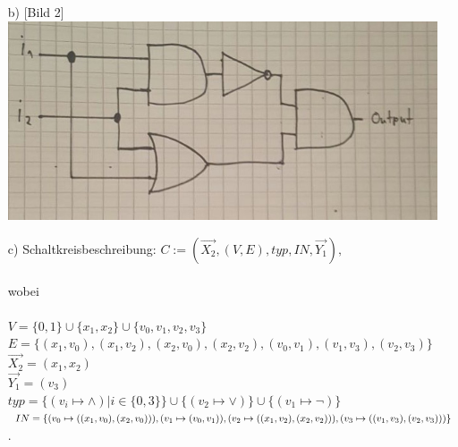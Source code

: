 \documentclass{scrartcl}
\begin{document}
\begin{itemize}
	\item[b)]
            [Bild 2]\\
            \includegraphics[width=14cm]{bild2.jpg}
	\item[c)] Schaltkreisbeschreibung:
	$ C := (\overrightarrow{X_{2}}, (V,E), typ, IN, \overrightarrow{Y_{1}}), $\\\\
	wobei\\\\
	$ V = \{0,1\} \cup \{x_{1}, x_{2}\} \cup \{v_{0}, v_{1}, v_{2}, v_{3}\} $\\
	$ E = \{(x_{1},v_{0}), (x_{1},v_{2}), (x_{2},v_{0}), (x_{2},v_{2}), (v_{0},v_{1}), (v_{1},v_{3}), (v_{2},v_{3})\} $ \\
	$ \overrightarrow{X_{2}} = (x_{1}, x_{2}) $ \\
	$ \overrightarrow{Y_{1}} = (v_{3}) $ \\
	$ typ = \{(v_{i} \mapsto \wedge) | i \in \{0,3\}\} \cup \{(v_{2} \mapsto \vee)\} \cup \{(v_{1} \mapsto \neg)\} $ \\
	$ IN = \{(v_{0} \mapsto ((x_{1}, v_{0}),(x_{2}, v_{0}))), (v_{1} \mapsto (v_{0}, v_{1})), (v_{2} \mapsto ((x_{1}, v_{2}),(x_{2}, v_{2}))),\\	 (v_{3} \mapsto ((v_{1}, v_{3}),(v_{2}, v_{3})))\} $.

	\end{itemize}
\end{document}
